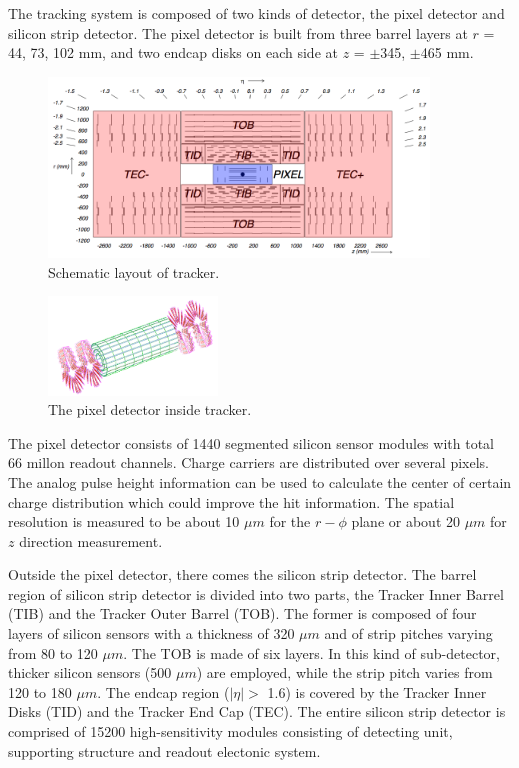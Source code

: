 The tracking system is composed of two kinds of detector, the pixel detector and silicon strip detector. The pixel detector is built from three barrel layers at $r$ = 44, 73, 102 mm, and two endcap disks on each side at $z$ = $\pm$345, $\pm$465 mm.
\begin{figure}[hbtp]
  \begin{center}
    \includegraphics[width=0.9\textwidth]{figure/CH2/tracker.png}
  \end{center}
  \caption{\label{fig:tracker}Schematic layout of tracker.}
\end{figure}
\begin{figure}[hbtp]
  \begin{center}
    \includegraphics[width=0.4\textwidth]{figure/CH2/pixel.png}
  \end{center}
  \caption{\label{fig:pixel}The pixel detector inside tracker.}
\end{figure}
\newline The pixel detector consists of 1440 segmented silicon sensor modules with total 66 millon readout channels. Charge carriers are distributed over several pixels. The analog pulse height information can be used to calculate the center of certain charge distribution which could improve the hit information. The spatial resolution is measured to be about 10 $\mu m$ for the $r-\phi$ plane or about 20 $\mu m$ for $z$ direction measurement.

Outside the pixel detector, there comes the silicon strip detector. The barrel region of silicon strip detector is divided into two parts, the Tracker Inner Barrel (TIB) and the Tracker Outer Barrel (TOB). The former is composed of four layers of silicon sensors with a thickness of 320 $\mu m$ and of strip pitches varying from 80 to 120 $\mu m$. The TOB is made of six layers. In this kind of sub-detector, thicker silicon sensors (500 $\mu m$) are employed, while the strip pitch varies from 120 to 180 $\mu m$. The endcap region ($|\eta| >$ 1.6) is covered by the Tracker Inner Disks (TID) and the Tracker End Cap (TEC). The entire silicon strip detector is comprised of 15200 high-sensitivity modules consisting of detecting unit, supporting structure and readout electonic system.

